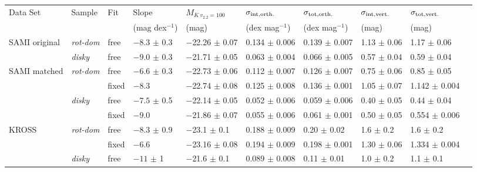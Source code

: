 \documentclass[a4paper,fleqn,usenatbib]{mnras}
\begin{document}
{\begin{table}
\centering
\begin{tabular}{ llllllllll}
\hline
Data Set & Sample & Fit &Slope & $M_{K\ v_{2.2}=100}$ & $\sigma_{\rm{int,orth.}}$ & $\sigma_{\rm{tot,orth.}}$ & $\sigma_{\rm{int,vert.}}$ & $\sigma_{\rm{tot,vert.}}$ \\
		 & 		  &     & (mag dex$^{-1}$)     & 	 (mag)      & (dex mag$^{-1}$)               & (dex mag$^{-1}$)              & (mag)              & (mag)              \\
\hline
SAMI original  & \textit{rot-dom}   & free  & $-8.3$ $\pm$ 0.3 		   			 & $-$22.26 $\pm$ 0.07 & 0.134 $\pm$ 0.006  					   & 0.139 $\pm$ 0.007 & 1.13 $\pm$ 0.06					   & 1.17\phantom{0} $\pm$ 0.06 \\%
 		& \textit{disky} & free  & $-9.0$ $\pm$ 0.3 		   			 & $-$21.71 $\pm$ 0.05 & 0.063 $\pm$ 0.004  					   & 0.066 $\pm$ 0.005 & 0.57 $\pm$ 0.04 & 0.59\phantom{0} $\pm$ 0.04 \\%
SAMI matched  & \textit{rot-dom}   & free  & $-6.6$ $\pm$ 0.3 		   			 & $-$22.73 $\pm$ 0.06 & 0.112 $\pm$ 0.007  					   & 0.126 $\pm$ 0.007 & 0.75 $\pm$ 0.06 & 0.85\phantom{0} $\pm$ 0.05 \\%
	    & 		      & fixed & $-8.3$ \phantom{$\pm$} \phantom{0.2} 		     & $-$22.74 $\pm$ 0.08				        & 0.125 $\pm$ 0.008  					   & 0.136 $\pm$ 0.001 & 1.05 $\pm$ 0.07					   & 1.142 $\pm$ 0.004 \\%
	    & \textit{disky} & free  & $-7.5$ $\pm$ 0.5 		   			 & $-$22.14 $\pm$ 0.05 & 0.052 $\pm$ 0.006  					   & 0.059 $\pm$ 0.006 & 0.40 $\pm$ 0.05 & 0.44\phantom{0} $\pm$ 0.04 \\%
	    & 			  & fixed & $-9.0$ \phantom{$\pm$} \phantom{0.2} 		   	 & $-$21.86 $\pm$ 0.07  & 0.055 $\pm$ 0.006  					   & 0.061 $\pm$ 0.001 & 0.50 $\pm$ 0.05				       & 0.554 $\pm$ 0.006 \\%
KROSS   & \textit{rot-dom}   & free  & $-8.3$ $\pm$ 0.9 		   			 & $-$23.1\phantom{0} $\pm$ 0.1\phantom{0} 					   & 0.188 $\pm$ 0.009  					   & 0.20\phantom{0} $\pm$ 0.02\phantom{0} & 1.6\phantom{0} $\pm$ 0.2 					   & 1.6\phantom{00} $\pm$ 0.2 \\%
	    & 		      & fixed & $-6.6$ \phantom{$\pm$} \phantom{0.2}			 & $-$23.16			  $\pm$ 0.08 		   & 0.194 $\pm$ 0.009  					   & 0.198 $\pm$ 0.001 & 1.30 $\pm$ 0.06 					   & 1.334 $\pm$ 0.004 \\%
	    & \textit{disky} & free  & $-11$\phantom{.} $\pm$ 1\phantom{.2} & $-$21.6\phantom{0} $\pm$ 0.1\phantom{0} & 0.089 $\pm$ 0.008  & 0.11\phantom{0} $\pm$ 0.01\phantom{0} & 1.0\phantom{0} $\pm$ 0.2\phantom{0} & 1.1\phantom{00} $\pm$ 0.1\phantom{0} \\%

\end{tabular}
\end{table}}
\end{document}
